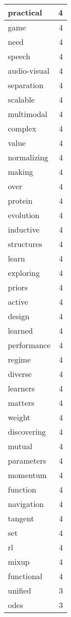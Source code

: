 \begin{table}[h]
\begin{tabular}{|l|r|}
\hline
practical & 4 \\
\hline
game & 4 \\
\hline
need & 4 \\
\hline
speech & 4 \\
\hline
audio-visual & 4 \\
\hline
separation & 4 \\
\hline
scalable & 4 \\
\hline
multimodal & 4 \\
\hline
complex & 4 \\
\hline
value & 4 \\
\hline
normalizing & 4 \\
\hline
making & 4 \\
\hline
over & 4 \\
\hline
protein & 4 \\
\hline
evolution & 4 \\
\hline
inductive & 4 \\
\hline
structures & 4 \\
\hline
learn & 4 \\
\hline
exploring & 4 \\
\hline
priors & 4 \\
\hline
active & 4 \\
\hline
design & 4 \\
\hline
learned & 4 \\
\hline
performance & 4 \\
\hline
regime & 4 \\
\hline
diverse & 4 \\
\hline
learners & 4 \\
\hline
matters & 4 \\
\hline
weight & 4 \\
\hline
discovering & 4 \\
\hline
mutual & 4 \\
\hline
parameters & 4 \\
\hline
momentum & 4 \\
\hline
function & 4 \\
\hline
navigation & 4 \\
\hline
tangent & 4 \\
\hline
set & 4 \\
\hline
rl & 4 \\
\hline
mixup & 4 \\
\hline
functional & 4 \\
\hline
unified & 3 \\
\hline
odes & 3 \\

\end{tabular}
\end{table}
